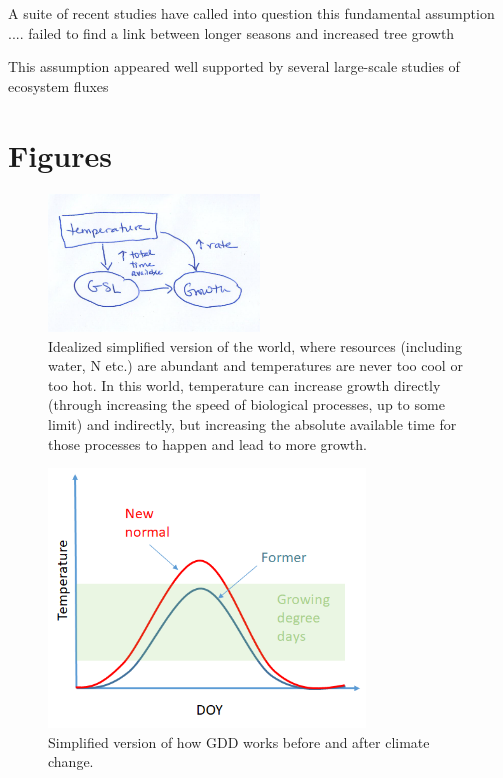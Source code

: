 \documentclass[11pt]{article}
\begin{document}
A suite of recent studies have called into question this fundamental assumption .... failed to find a link between longer seasons and increased tree growth

This assumption appeared well supported by several large-scale studies of ecosystem fluxes 


\section{Figures}
\newpage
\begin{figure}[h!]
\includegraphics[width=0.5\textwidth]{..//figures/gsltogrowth/gsltogrowth_emw1a.png}
\caption{Idealized simplified version of the world, where resources (including water, N etc.) are abundant and temperatures are never too cool or too hot. In this world, temperature can increase growth directly (through increasing the speed of biological processes, up to some limit) and indirectly, but increasing the absolute available time for those processes to happen and lead to more growth.}
\label{fig:concepbiotime}
\end{figure}


\begin{figure}[h!]
\includegraphics[width=0.75\textwidth]{..//figures/simpletempcurve_fromlucidboard.png}
\caption{Simplified version of how GDD works before and after climate change.}
\label{fig:simpletemp}
\end{figure}
\end{document}
